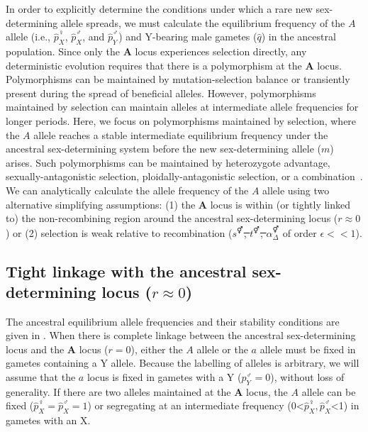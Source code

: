 \documentclass[10pt,letterpaper]{article}
\providecommand{\DIFadd}[1]{{\protect\color{blue}\uwave{#1}}} %
\providecommand{\DIFdel}[1]{{\protect\color{red}\sout{#1}}}                      %
\providecommand{\DIFaddbegin}{} %
\providecommand{\DIFaddend}{} %
\providecommand{\DIFdelbegin}{} %
\providecommand{\DIFdelend}{} %
\begin{document}
In order to explicitly determine the conditions under which a rare new sex-determining allele spreads, we must calculate the equilibrium frequency of the $A$ allele (i.e., $\hat{p}^\female_X$, $\hat{p}^\male_X$, and $\hat{p}^\male_Y$) and Y-bearing male gametes ($\hat{q}$) in the ancestral population. 
Since only the $\mathbf{A}$ locus experiences selection directly, any deterministic evolution requires that there is a polymorphism at the $\mathbf{A}$ locus. 
Polymorphisms can be maintained by mutation-selection balance or transiently present during the spread of beneficial alleles. 
However, polymorphisms maintained by selection can maintain alleles at intermediate allele frequencies for longer periods. 
Here, we focus on polymorphisms maintained by selection, where the $A$ allele reaches a stable intermediate equilibrium frequency under the ancestral sex-determining system before the new sex-determining allele ($m$) arises. 
Such polymorphisms can be maintained by heterozygote advantage, sexually-antagonistic selection, ploidally-antagonistic selection, or a combination~\cite{Immler:2012tl}.
We can analytically calculate the allele frequency of the $A$ allele using two alternative simplifying assumptions: 
(1) the $\mathbf{A}$ locus is within (or tightly linked to) the non-recombining region around the ancestral sex-determining locus ($r \approx 0$) or (2) selection is weak relative to recombination (\DIFdelbegin \DIFdel{$s^\Hermaphrodite$, $t^\Hermaphrodite$, $\alpha_{\Delta}^\Hermaphrodite$ }\DIFdelend \DIFaddbegin \DIFadd{$s^\circ$, $t^\circ$, $\alpha_{\Delta}^\circ$ }\DIFaddend of order $\epsilon<<1$). 

\subsection*{Tight linkage with the ancestral sex-determining locus ($r \approx 0$)}

The ancestral equilibrium allele frequencies and their stability conditions are given in . 
When there is complete linkage between the ancestral sex-determining locus and the $\mathbf{A}$ locus ($r=0$), either the $A$ allele or the $a$ allele must be fixed in gametes containing a Y allele. 
Because the labelling of alleles is arbitrary, we will assume that the $a$ locus is fixed in gametes with a Y ($p^\male_Y=0$), without loss of generality. 
If there are two alleles maintained at the $\mathbf{A}$ locus, the $A$ allele can be fixed ($\hat{p}^\female_X=\hat{p}^\male_X=1$) or segregating at an intermediate frequency (0<$\hat{p}^\female_X, \hat{p}^\male_X$<1) in gametes with an X. 
\end{document}
